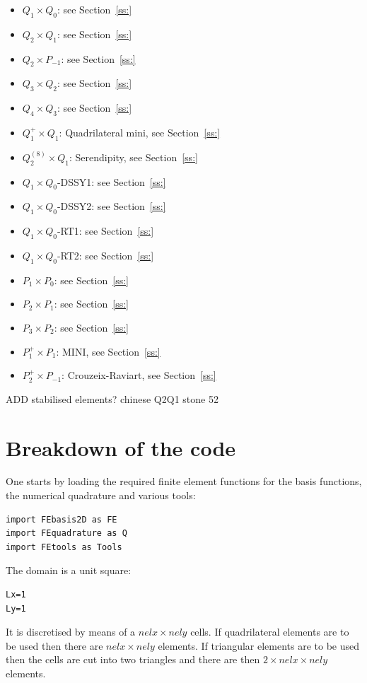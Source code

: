 \begin{itemize}
\item $Q_1\times Q_0$: see Section~\ref{ss:}
\item $Q_2\times Q_1$: see Section~\ref{ss:}
\item $Q_2\times P_{-1}$: see Section~\ref{ss:}
\item $Q_3\times Q_2$: see Section~\ref{ss:}
\item $Q_4\times Q_3$: see Section~\ref{ss:}
\item $Q_1^+\times Q_1$: Quadrilateral mini, see Section~\ref{ss:}
\item $Q_2^{(8)}\times Q_1$: Serendipity, see Section~\ref{ss:}
\item $Q_1\times Q_0$-DSSY1: see Section~\ref{ss:}
\item $Q_1\times Q_0$-DSSY2: see Section~\ref{ss:}
\item $Q_1\times Q_0$-RT1: see Section~\ref{ss:}
\item $Q_1\times Q_0$-RT2: see Section~\ref{ss:}
\item $P_1\times P_0$: see Section~\ref{ss:}
\item $P_2\times P_1$: see Section~\ref{ss:}
\item $P_3\times P_2$: see Section~\ref{ss:}
\item $P_1^{+}\times P_{1}$: MINI, see Section~\ref{ss:}
\item $P_2^+\times P_{-1}$: Crouzeix-Raviart, see Section~\ref{ss:}
\end{itemize}

ADD stabilised elements?
chinese Q2Q1 stone 52

\section*{Breakdown of the code}

One starts by loading the required finite element functions 
for the basis functions, the numerical quadrature and various tools:
\begin{lstlisting}
import FEbasis2D as FE
import FEquadrature as Q
import FEtools as Tools 
\end{lstlisting}

The domain is a unit square:
\begin{lstlisting}
Lx=1
Ly=1
\end{lstlisting}

It is discretised by means of a $nelx\times nely$ cells. If quadrilateral 
elements are to be used then there are $nelx\times nely$ elements. If 
triangular elements are to be used then the cells are cut into two 
triangles and there are then $2\times nelx\times nely$ elements.

